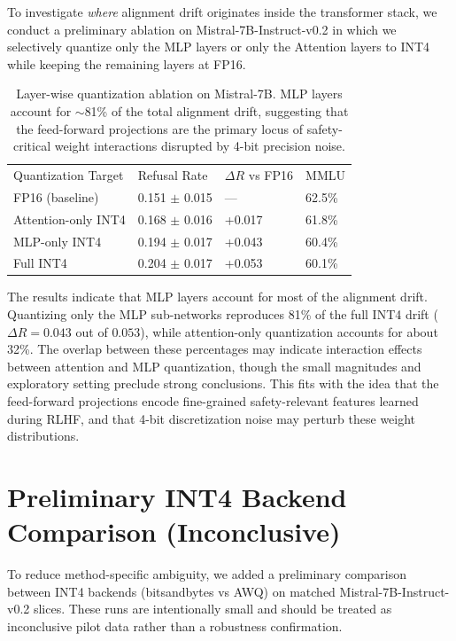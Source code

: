 \documentclass[11pt]{article}
\begin{document}
To investigate \emph{where} alignment drift originates inside the transformer stack, we conduct a preliminary ablation on Mistral-7B-Instruct-v0.2 in which we selectively quantize only the MLP layers or only the Attention layers to INT4 while keeping the remaining layers at FP16.

\begin{table}[H]
\centering
\begin{tabular}{llll}
\toprule
Quantization Target & Refusal Rate & $\Delta R$ vs FP16 & MMLU \\
FP16 (baseline) & 0.151 $\pm$ 0.015 & --- & 62.5\% \\
\midrule
Attention-only INT4 & 0.168 $\pm$ 0.016 & +0.017 & 61.8\% \\
MLP-only INT4 & 0.194 $\pm$ 0.017 & +0.043 & 60.4\% \\
Full INT4 & 0.204 $\pm$ 0.017 & +0.053 & 60.1\% \\
\bottomrule
\end{tabular}
\caption{Layer-wise quantization ablation on Mistral-7B. MLP layers account for $\sim$81\% of the total alignment drift, suggesting that the feed-forward projections are the primary locus of safety-critical weight interactions disrupted by 4-bit precision noise.}
\label{tab:layerwise}
\end{table}

The results indicate that MLP layers account for most of the alignment drift. Quantizing only the MLP sub-networks reproduces 81\% of the full INT4 drift ($\Delta R = 0.043$ out of $0.053$), while attention-only quantization accounts for about 32\%. The overlap between these percentages may indicate interaction effects between attention and MLP quantization, though the small magnitudes and exploratory setting preclude strong conclusions. This fits with the idea that the feed-forward projections encode fine-grained safety-relevant features learned during RLHF, and that 4-bit discretization noise may perturb these weight distributions.

\section{Preliminary INT4 Backend Comparison (Inconclusive)}
\label{app:backend_robustness}

To reduce method-specific ambiguity, we added a preliminary comparison between INT4 backends (bitsandbytes vs AWQ) on matched Mistral-7B-Instruct-v0.2 slices. These runs are intentionally small and should be treated as inconclusive pilot data rather than a robustness confirmation.
\end{document}
